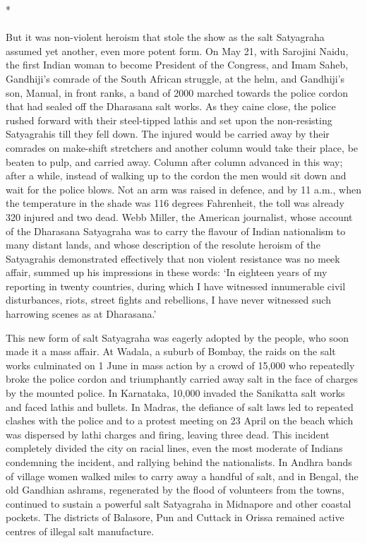 \begin{center}*\end{center}

\paragraph*{}


But it was non-violent heroism that stole the show as the salt Satyagraha assumed yet another, even more potent form. On May 21, with Sarojini Naidu, the first Indian woman to become President of the Congress, and Imam Saheb, Gandhiji's comrade of the South African struggle, at the helm, and Gandhiji's son, Manual, in front ranks, a band of 2000 marched towards the police cordon that had sealed off the Dharasana salt works. As they caine close, the police rushed forward with their steel-tipped lathis and set upon the non-resisting Satyagrahis till they fell down. The injured would be carried away by their comrades on make-shift stretchers and another column would take their place, be beaten to pulp, and carried away. Column after column advanced in this way; after a while, instead of walking up to the cordon the men would sit down and wait for the police blows. Not an arm was raised in defence, and by 11 a.m., when the temperature in the shade was 116 degrees Fahrenheit, the toll was already 320 injured and two dead. Webb Miller, the American journalist, whose account of the Dharasana Satyagraha was to carry the flavour of Indian nationalism to many distant lands, and whose description of the resolute heroism of the Satyagrahis demonstrated effectively that non­ violent resistance was no meek affair, summed up his impressions in these words: `In eighteen years of my reporting in twenty countries, during which I have witnessed innumerable civil disturbances, riots, street fights and rebellions, I have never witnessed such harrowing scenes as at Dharasana.' 

This new form of salt Satyagraha was eagerly adopted by the people, who soon made it a mass affair. At Wadala, a suburb of Bombay, the raids on the salt works culminated on 1 June in mass action by a crowd of 15,000 who repeatedly broke the police cordon and triumphantly carried away salt in the face of charges by the mounted police. In Karnataka, 10,000 invaded the Sanikatta salt works and faced lathis and bullets. In Madras, the defiance of salt laws led to repeated clashes with the police and to a protest meeting on 23 April on the beach which was dispersed by lathi charges and firing, leaving three dead. This incident completely divided the city on racial lines, even the most moderate of Indians condemning the incident, and rallying behind the nationalists. In Andhra bands of village women walked miles to carry away a handful of salt, and in Bengal, the old Gandhian ashrams, regenerated by the flood of volunteers from the towns, continued to sustain a powerful salt Satyagraha in Midnapore and other coastal pockets. The districts of Balasore, Pun and Cuttack in Orissa remained active centres of illegal salt manufacture.


